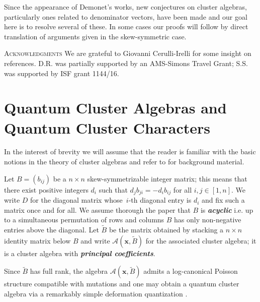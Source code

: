 \documentclass[12pt]{amsart}
\newcommand{\bfx}{\mathbf{x}}
\newcommand{\cA}{\mathcal{A}}
\newcommand{\newword}[1]{\textbf{\emph{#1}}}
\begin{document}
  Since the appearance of Demonet's works, new conjectures on cluster algebras, particularly ones related to denominator vectors, have been made and our goal here is to resolve several of these.
  In some cases our proofs will follow by direct translation of arguments given in the skew-symmetric case. 

\textsc{Acknowledgments}
  We are grateful to Giovanni Cerulli-Irelli for some insight on references.
  D.R. was partially supported by an AMS-Simons Travel Grant; S.S. was supported by ISF grant 1144/16.

\section{Quantum Cluster Algebras and Quantum Cluster Characters}
\label{sec:qca}
  
  In the interest of brevity we will assume that the reader is familiar with the basic notions in the theory of cluster algebras and refer to \cite{fomin-zelevinsky4} for background material.

  Let $B=(b_{ij})$ be a $n\times n$ skew-symmetrizable integer matrix; this means that there exist positive integers $d_i$ such that $d_jb_{ji}=-d_ib_{ij}$ for all $i,j\in[1,n]$. 
  We write $D$ for the diagonal matrix whose~$i$-th diagonal entry is $d_i$ and fix such a matrix once and for all.
  We assume thorough the paper that $B$ is \newword{acyclic} i.e. up to a simultaneous permutation of rows and columns $B$ has only non-negative entries above the diagonal.
  Let $\widetilde{B}$ be the matrix obtained by stacking a $n\times n$ identity matrix below $B$ and write $\cA(\bfx,\widetilde{B})$ for the associated cluster algebra; it is a cluster algebra with \newword{principal coefficients}.

  Since $\widetilde{B}$ has full rank, the algebra $\cA(\bfx,\widetilde{B})$ admits a log-canonical Poisson structure compatible with mutations \cite{gekhtman-shapiro-vainshtein} and one may obtain a quantum cluster algebra via a remarkably simple deformation quantization \cite{berenstein-zelevinsky}.  
\end{document}
